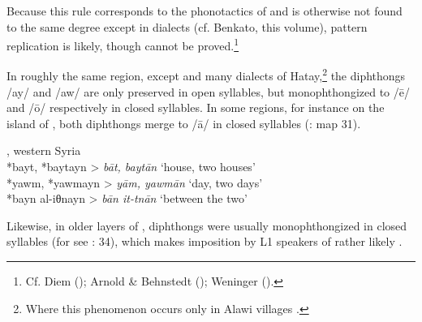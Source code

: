\documentclass[output=paper]{langsci/langscibook}
\begin{document}
Because this rule corresponds to the phonotactics of  and is otherwise not found to the same degree except in  dialects (cf. Benkato, this volume), pattern {replication} is likely, though cannot be proved.\footnote{Cf. Diem (\citeyear[47]{Diem1979}); Arnold \& Behnstedt (\citeyear[69--71]{ArnoldBehnstedt1993}); Weninger (\citeyear[748]{Weninger2011Aramaic}).}

In roughly the same region, except  and many dialects of Hatay,\footnote{Where this phenomenon occurs only in Alawi villages \citep[84]{Arnold1998}.} the {diphthongs} /ay/ and /aw/ are only preserved in open syllables, but monophthongized to /ē/ and /ō/ respectively in closed syllables. In some regions, for instance on the island of , both {diphthongs} {merge} to /ā/ in closed syllables (\citealt{Behnstedt1997}: map 31). 

\ea 
{, western Syria \citep[278]{Procházka2013}} \\
    \textup{} *bayt, *baytayn > \textit{bāt, baytān} \textup{‘house, two houses’\\
} *yawm, *yawmayn >  \textit{yām, yawmān} \textup{‘day, two days’\\
} *bayn al-iθnayn > \textit{bān it-tnān} \textup{‘}\textup{between the two’}\\
\z

Likewise, in older layers of , {diphthongs} were usually monophthongized in closed syllables (for  see \citealt{Nöldeke1904Semitic}: 34), which makes {imposition} by L1 speakers of  rather likely \citep[227]{Fleisch1974Kfar}.
\end{document}
